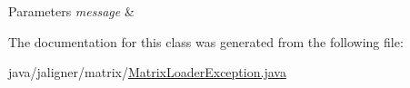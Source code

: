 \begin{DoxyParams}{Parameters}
{\em message} & \\
\hline
\end{DoxyParams}


The documentation for this class was generated from the following file\+:\begin{DoxyCompactItemize}
\item 
java/jaligner/matrix/\hyperlink{_matrix_loader_exception_8java}{Matrix\+Loader\+Exception.\+java}\end{DoxyCompactItemize}

